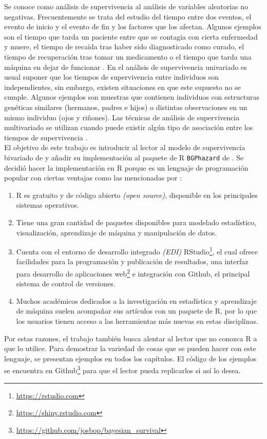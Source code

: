 \documentclass[11pt,a4paper]{article}
\begin{document}
Se conoce como análisis de supervivencia al análisis de variables aleatorias no negativas. Frecuentemente se trata del estudio del tiempo entre dos eventos, el evento de inicio y el evento de fin y los factores que los afectan. Algunos ejemplos son el tiempo que tarda un paciente entre que se contagia con cierta enfermedad y muere, el tiempo de recaída tras haber sido diagnosticado como curado, el tiempo de recuperación tras tomar un medicamento o el tiempo que tarda una máquina en dejar de funcionar \citep{moore}. En el análisis de supervivencia univariado es usual suponer que los tiempos de supervivencia entre individuos son independientes, sin embargo, existen situaciones en que este supuesto no se cumple. Algunos ejemplos son muestras que contienen individuos con estructuras genéticas similares (hermanos, padres e hijos) o distintas observaciones en un mismo individuo (ojos y riñones). Las técnicas de análisis de supervivencia multivariado se utilizan cuando puede existir algún tipo de asociación entre los tiempos de supervivencia \citep{klein}.\\

El objetivo de este trabajo es introducir al lector al modelo de supervivencia bivariado de \citet{nieto} y añadir su implementación al paquete de R \texttt{BGPhazard} de \citet{bgphazard}. Se decidió hacer la implementación en R porque es un lenguaje de programación popular con ciertas ventajas como las mencionadas por \citet{advanced_r}:
\begin{enumerate}
\item R es gratuito y de código abierto \textit{(open source)}, disponible en los principales sistemas operativos.
\item Tiene una gran cantidad de paquetes disponibles para modelado estadístico, visualización, aprendizaje de máquina y manipulación de datos.
\item Cuenta con el entorno de desarrollo integrado \textit{(EDI)} RStudio\footnote{\url{https://rstudio.com}}, el cual ofrece facilidades para la programación y publicación de resultados, una interfaz para desarrollo de aplicaciones web\footnote{\url{https://shiny.rstudio.com}} e integración con Github, el principal sistema de control de versiones.
\item Muchos académicos dedicados a la investigación en estadística y aprendizaje de máquina suelen acompañar sus artículos con un paquete de R, por lo que los usuarios tienen acceso a las herramientas más nuevas en estas disciplinas.
\end{enumerate}
Por estas razones, el trabajo también busca alentar al lector que no conozca R a que lo utilice. Para demostrar la variedad de cosas que se pueden hacer con este lenguaje, se presentan ejemplos en todos los capítulos. El código de los ejemplos se encuentra en Github\footnote{\url{https://github.com/josbop/bayesian_survival}} para que el lector pueda replicarlos si así lo desea.\\
\end{document}
